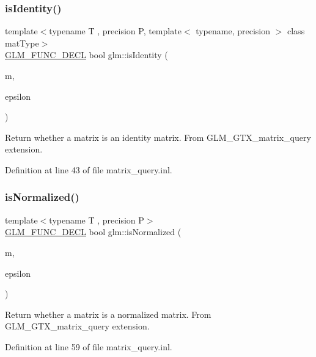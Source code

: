\subsubsection{\texorpdfstring{is\+Identity()}{isIdentity()}}
{\footnotesize\ttfamily template$<$typename T , precision P, template$<$ typename, precision $>$ class mat\+Type$>$ \\
\hyperlink{setup_8hpp_ab2d052de21a70539923e9bcbf6e83a51}{G\+L\+M\+\_\+\+F\+U\+N\+C\+\_\+\+D\+E\+CL} bool glm\+::is\+Identity (\begin{DoxyParamCaption}\item[{mat\+Type$<$ T, P $>$ const \&}]{m,  }\item[{T const \&}]{epsilon }\end{DoxyParamCaption})}

Return whether a matrix is an identity matrix. From G\+L\+M\+\_\+\+G\+T\+X\+\_\+matrix\+\_\+query extension. 

Definition at line 43 of file matrix\+\_\+query.\+inl.

\mbox{\label{group__gtx__matrix__query_gaae7339fac94c86ed741f20b6915682ab}} 
\subsubsection{\texorpdfstring{is\+Normalized()}{isNormalized()}\hspace{0.1cm}{\footnotesize\ttfamily [1/3]}}
{\footnotesize\ttfamily template$<$typename T , precision P$>$ \\
\hyperlink{setup_8hpp_ab2d052de21a70539923e9bcbf6e83a51}{G\+L\+M\+\_\+\+F\+U\+N\+C\+\_\+\+D\+E\+CL} bool glm\+::is\+Normalized (\begin{DoxyParamCaption}\item[{\hyperlink{structglm_1_1detail_1_1tmat2x2}{detail\+::tmat2x2}$<$ T, P $>$ const \&}]{m,  }\item[{T const \&}]{epsilon }\end{DoxyParamCaption})}

Return whether a matrix is a normalized matrix. From G\+L\+M\+\_\+\+G\+T\+X\+\_\+matrix\+\_\+query extension. 

Definition at line 59 of file matrix\+\_\+query.\+inl.

